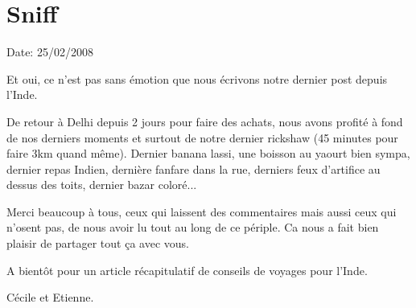 \section{Sniff}

Date: 25/02/2008

\begin{multicols}{2}

Et oui, ce n'est pas sans émotion que nous écrivons notre dernier post depuis l'Inde.

De retour à Delhi depuis 2 jours pour faire des achats, nous avons profité à fond de nos derniers moments et surtout de notre dernier rickshaw (45 minutes pour faire 3km quand même). Dernier banana lassi, une boisson au yaourt bien sympa, dernier repas Indien, dernière fanfare dans la rue, derniers feux d'artifice au dessus des toits, dernier bazar coloré...

Merci beaucoup à tous, ceux qui laissent des commentaires mais aussi ceux qui n'osent pas, de nous avoir lu tout au long de ce périple. Ca nous a fait bien plaisir de partager tout ça avec vous.

A bientôt pour un article récapitulatif de conseils de voyages pour l'Inde.

Cécile et Etienne.

\end{multicols}


